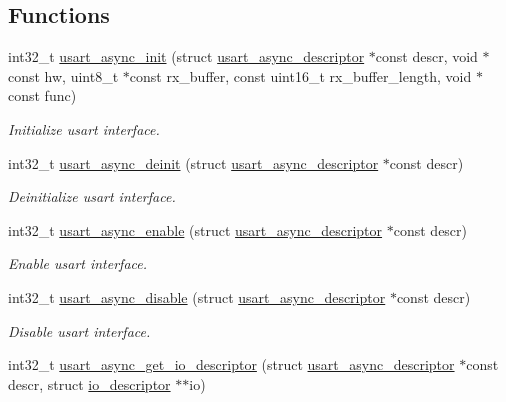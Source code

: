 \subsection*{Functions}
\begin{DoxyCompactItemize}
\item 
int32\+\_\+t \hyperlink{group__doc__driver__hal__usart__async_gaafe146c618b950c9715efb0fdc6a7484}{usart\+\_\+async\+\_\+init} (struct \hyperlink{structusart__async__descriptor}{usart\+\_\+async\+\_\+descriptor} $\ast$const descr, void $\ast$const hw, uint8\+\_\+t $\ast$const rx\+\_\+buffer, const uint16\+\_\+t rx\+\_\+buffer\+\_\+length, void $\ast$const func)
\begin{DoxyCompactList}\small\item\em Initialize usart interface. \end{DoxyCompactList}\item 
int32\+\_\+t \hyperlink{group__doc__driver__hal__usart__async_gab7ef65ba7b4afd13cb11dcc72315ca43}{usart\+\_\+async\+\_\+deinit} (struct \hyperlink{structusart__async__descriptor}{usart\+\_\+async\+\_\+descriptor} $\ast$const descr)
\begin{DoxyCompactList}\small\item\em Deinitialize usart interface. \end{DoxyCompactList}\item 
int32\+\_\+t \hyperlink{group__doc__driver__hal__usart__async_gaa752e7d978b7f3bc35c97f9a7eb5f98a}{usart\+\_\+async\+\_\+enable} (struct \hyperlink{structusart__async__descriptor}{usart\+\_\+async\+\_\+descriptor} $\ast$const descr)
\begin{DoxyCompactList}\small\item\em Enable usart interface. \end{DoxyCompactList}\item 
int32\+\_\+t \hyperlink{group__doc__driver__hal__usart__async_ga575b7b546a7357088530a9cebf60ad9a}{usart\+\_\+async\+\_\+disable} (struct \hyperlink{structusart__async__descriptor}{usart\+\_\+async\+\_\+descriptor} $\ast$const descr)
\begin{DoxyCompactList}\small\item\em Disable usart interface. \end{DoxyCompactList}\item 
int32\+\_\+t \hyperlink{group__doc__driver__hal__usart__async_ga964be25acbad24e7d0cb9e72f5f5582f}{usart\+\_\+async\+\_\+get\+\_\+io\+\_\+descriptor} (struct \hyperlink{structusart__async__descriptor}{usart\+\_\+async\+\_\+descriptor} $\ast$const descr, struct \hyperlink{structio__descriptor}{io\+\_\+descriptor} $\ast$$\ast$io)
$$
\end{DoxyCompactItemize}
